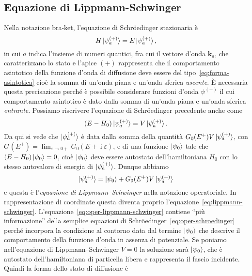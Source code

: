 \documentclass[a4paper,fleqn,twoside,12pt]{article}
\renewcommand{\epsilon}{\varepsilon}
\DeclareMathOperator{\uimm}{\mathrm{i}} %
\begin{document}
\subsection{Equazione di Lippmann-Schwinger}
\label{sec:oper-equazione-di-ls}

Nella notazione bra-ket, l'equazione di Schröedinger stazionaria è
\begin{equation}
  H \ket{\psi_{a}^{(+)}} = E \ket{\psi_{a}^{(+)}},
\end{equation}
in cui $a$ indica l'insieme di numeri quantici, fra cui il vettore d'onda
$\bm{k}_{a}$, che caratterizzano lo stato e l'apice $(+)$ rappresenta che il
comportamento asintotico della funzione d'onda di diffusione deve essere del
tipo~\eqref{eq:forma-asintotica} cioè la somma di un'onda piana e un'onda
sferica \emph{uscente}.  È necessaria questa precisazione perché è possibile
considerare funzioni d'onda $\psi^{(-)}$ il cui comportamento asintotico è dato
dalla somma di un'onda piana e un'onda sferica \emph{entrante}.  Possiamo
riscrivere l'equazione di Schröedinger precedente anche come
\begin{equation}
  \label{eq:oper-schroedinger}
  (E - H_{0})\ket{\psi_{a}^{(+)}} = V \ket{\psi_{a}^{(+)}}.
\end{equation}
Da qui si vede che $\ket{\psi_{a}^{(+)}}$ è data dalla somma della quantità
$G_{0}(E^{+})V\ket{\psi_{a}^{(+)}}$, con
$G_{}(E^{+})
= \lim_{\epsilon \to 0+} G_{0}(E + \uimm \epsilon)$,
e di una funzione $\ket{\psi_{0}}$ tale che $(E - H_{0})\ket{\psi_{0}} = 0$,
cioè $\ket{\psi_{0}}$ deve essere autostato dell'hamiltoniana $H_{0}$ con lo
stesso autovalore di energia di $\ket{\psi_{a}^{(+)}}$.  Dunque abbiamo
\begin{equation}
  \label{eq:oper-lippmann-schwinger}
  \ket{\psi_{a}^{(+)}} = \ket{\psi_{0}} + G_{0}(E^{+})V\ket{\psi_{a}^{(+)}}
\end{equation}
e questa è l'\emph{equazione di Lippmann–Schwinger} nella notazione
operatoriale.  In rappresentazione di coordinate questa diventa proprio
l'equazione~\eqref{eq:lippmann-schwinger}.
L'equazione~\eqref{eq:oper-lippmann-schwinger} contiene ``più informazione''
della semplice equazioni di Schröedinger~\eqref{eq:oper-schroedinger} perché
incorpora la condizione al contorno data dal termine $\ket{\psi_{0}}$ che
descrive il comportamento della funzione d'onda in assenza di potenziale.  Se
poniamo nell'equazione di Lippmann–Schwinger $V = 0$ la soluzione sarà
$\ket{\psi_{0}}$, che è autostato dell'hamiltoniana di particella libera e
rappresenta il fascio incidente.  Quindi la forma dello stato di diffusione è
\end{document}
